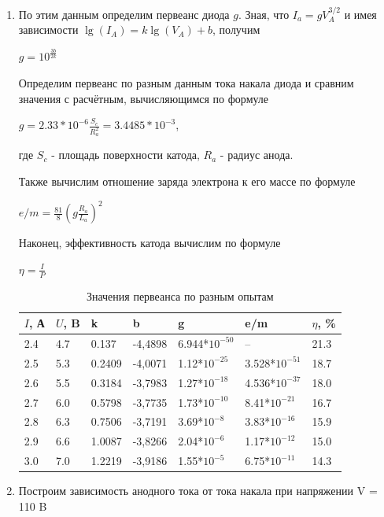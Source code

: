 \documentclass[a4paper]{article}
\begin{document}
\begin{enumerate}
\item По этим данным определим первеанс диода $g$. Зная, что $I_a = gV_A^{3/2}$ и имея зависимости $\lg(I_A) = k \lg(V_A) + b$, получим
\begin{center}
    $g = 10^{\frac{3b}{2k}}$
\end{center}

Определим первеанс по разным данным тока накала диода и сравним значения с расчётным, вычисляющимся по формуле

\begin{center}
    $g = 2.33*10^{-6} \frac{S_c}{R_a ^2} = 3.4485*10^{-3}$,
\end{center}
где $S_c$ - площадь поверхности катода, $R_a$ - радиус анода. \par

Также вычислим отношение заряда электрона к его массе по формуле

\begin{center}
   $e/m = \frac{81}{8}(g\frac{R_a}{L_a})^2$
\end{center}

Наконец, эффективность катода вычислим по формуле
\begin{center}
    $\eta = \frac{I}{P}$
\end{center}

    \begin{table}[h]
    \centering
    \begin{center}
    \caption{Значения первеанса по разным опытам}
    \end{center}
    \vspace{0.1cm}
    \label{tab:my_label}
    \begin{tabular}{ |p{1cm}|p{1cm}|p{1cm}|p{2cm}|p{2cm}|p{2cm}|p{2cm}|}
 \hline
 $I$, А & $U$, B & k & b & g & e/m & $\eta$, \% \\
 \hline
2.4 & 4.7 & 0.137 & -4,4898 & 6.944*$10^{-50}$ & -- & 21.3\\
 \hline
2.5 & 5.3 & 0.2409 & -4,0071 & 1.12*$10^{-25}$ & 3.528*$10^{-51}$ & 18.7\\
 \hline
2.6 & 5.5 & 0.3184 & -3,7983 & 1.27*$10^{-18}$ & 4.536*$10^{-37}$ & 18.0\\
 \hline
2.7 & 6.0 & 0.5798 & -3,7735 & 1.73*$10^{-10}$ & 8.41*$10^{-21}$ & 16.7\\
 \hline
2.8 & 6.3 & 0.7506 & -3,7191 & 3.69*$10^{-8}$ & 3.83*$10^{-16}$ & 15.9 \\
 \hline
2.9 & 6.6 & 1.0087 & -3,8266 & 2.04*$10^{-6}$ & 1.17*$10^{-12}$ & 15.0\\
 \hline
3.0 & 7.0 & 1.2219 & -3,9186 & 1.55*$10^{-5}$ & 6.75*$10^{-11}$ & 14.3\\
 \hline 
\end{tabular}
\end{table}

\item Построим зависимость анодного тока от тока накала при напряжении V = 110 B

\end{enumerate}
\end{document}
